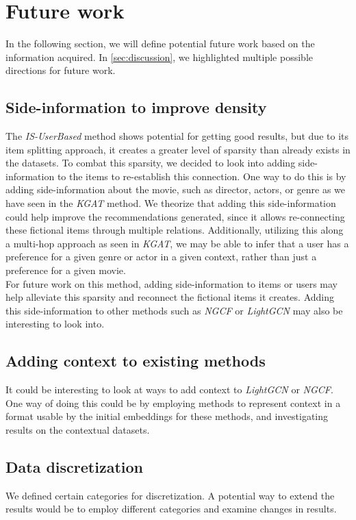 \section{Future work}\label{sec:futurework}
In the following section, we will define potential future work based on the information acquired.
In \autoref{sec:discussion}, we highlighted multiple possible directions for future work.

\subsection{Side-information to improve density}
The \textit{IS-UserBased} method shows potential for getting good results, but due to its item splitting approach, it creates a greater level of sparsity than already exists in the datasets.
To combat this sparsity, we decided to look into adding side-information to the items to re-establish this connection.
One way to do this is by adding side-information about the movie, such as director, actors, or genre as we have seen in the \textit{KGAT} method.
We theorize that adding this side-information could help improve the recommendations generated, since it allows re-connecting these fictional items through multiple relations.
Additionally, utilizing this along a multi-hop approach as seen in \textit{KGAT}, we may be able to infer that a user has a preference for a given genre or actor in a given context, rather than just a preference for a given movie.\\
For future work on this method, adding side-information to items or users may help alleviate this sparsity and reconnect the fictional items it creates.
Adding this side-information to other methods such as \textit{NGCF} or \textit{LightGCN} may also be interesting to look into.

\subsection{Adding context to existing methods}
It could be interesting to look at ways to add context to \textit{LightGCN} or \textit{NGCF}.
One way of doing this could be by employing methods to represent context in a format usable by the initial embeddings for these methods, and investigating results on the contextual datasets.

\subsection{Data discretization}
We defined certain categories for discretization.
A potential way to extend the results would be to employ different categories and examine changes in results.

